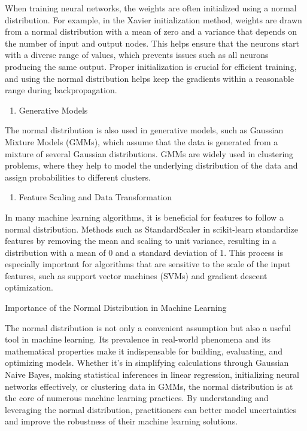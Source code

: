 \documentclass[
  12 pt,
  a4paper,
]{book}
\providecommand{\tightlist}{%
  \setlength{\itemsep}{0pt}\setlength{\parskip}{0pt}}
\numberwithin{equation}{section}
\theoremstyle{plain}      %
\theoremstyle{definition} %
\theoremstyle{remark}     %
\theoremstyle{note}         %
\begin{document}
When training neural networks, the weights are often initialized using a
normal distribution. For example, in the Xavier initialization method,
weights are drawn from a normal distribution with a mean of zero and a
variance that depends on the number of input and output nodes. This
helps ensure that the neurons start with a diverse range of values,
which prevents issues such as all neurons producing the same output.
Proper initialization is crucial for efficient training, and using the
normal distribution helps keep the gradients within a reasonable range
during backpropagation.

\begin{enumerate}
\def\labelenumi{\arabic{enumi}.}
\setcounter{enumi}{3}
\tightlist
\item
  Generative Models
\end{enumerate}

The normal distribution is also used in generative models, such as
Gaussian Mixture Models (GMMs), which assume that the data is generated
from a mixture of several Gaussian distributions. GMMs are widely used
in clustering problems, where they help to model the underlying
distribution of the data and assign probabilities to different clusters.

\begin{enumerate}
\def\labelenumi{\arabic{enumi}.}
\setcounter{enumi}{4}
\tightlist
\item
  Feature Scaling and Data Transformation
\end{enumerate}

In many machine learning algorithms, it is beneficial for features to
follow a normal distribution. Methods such as StandardScaler in
scikit-learn standardize features by removing the mean and scaling to
unit variance, resulting in a distribution with a mean of 0 and a
standard deviation of 1. This process is especially important for
algorithms that are sensitive to the scale of the input features, such
as support vector machines (SVMs) and gradient descent optimization.

Importance of the Normal Distribution in Machine Learning

The normal distribution is not only a convenient assumption but also a
useful tool in machine learning. Its prevalence in real-world phenomena
and its mathematical properties make it indispensable for building,
evaluating, and optimizing models. Whether it's in simplifying
calculations through Gaussian Naive Bayes, making statistical inferences
in linear regression, initializing neural networks effectively, or
clustering data in GMMs, the normal distribution is at the core of
numerous machine learning practices. By understanding and leveraging the
normal distribution, practitioners can better model uncertainties and
improve the robustness of their machine learning solutions.
\end{document}
